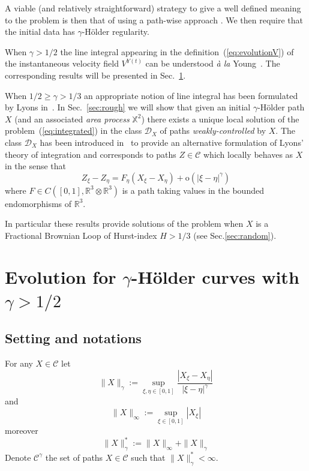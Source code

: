 \documentclass[a4paper,12pt,reqno]{amsart}
\newcommand{\norm}[1]{\|#1\|}
\newcommand{\RR}{\mathbb{R}^3}
\newcommand{\CC}{\mathscr{C}}
\newcommand{\DX}{\mathscr{D}_{X}}
\begin{document}
A viable (and relatively straightforward) strategy to give a well defined
meaning to the problem is then that of using a path-wise approach 
. We then require that the initial data has
$\gamma$-H\"older regularity. 

When $\gamma >
1/2$ the line integral appearing in the
definition~(\ref{eq:evolutionV}) of the instantaneous velocity field
$V^{Y(t)}$ can be understood \emph{\`a la} Young~\cite{young}. The
corresponding results will be presented in
Sec.~\ref{sec:young}. 

When $1/2 \ge  \gamma > 1/3$ an appropriate
notion of line integral has been formulated by Lyons
in~\cite{Lyons,LyonsBook}. In Sec.~\ref{sec:rough} we will show that
given an initial $\gamma$-H\"older path $X$ (and
an associated \emph{area process} $\mathbb{X}^2$) there exists a  unique local
solution of the problem~(\ref{eq:integrated}) in the class $\DX$ of paths
\emph{weakly-controlled} by $X$. The class $\DX$ has been introduced
in~\cite{Gubinelli} to provide an alternative formulation of Lyons' theory of
integration and corresponds to paths $Z \in \CC$ which locally behaves as
$X$ in the sense that
$$
Z_\xi - Z_\eta = F_\eta (X_\xi-X_\eta) + \text{o}(|\xi-\eta|^\gamma)
$$
where $F \in C([0,1],\RR \otimes \RR)$ is a path taking values in the
bounded endomorphisms of $\RR$.

In particular these results provide solutions of the problem when $X$
is a Fractional Brownian Loop of Hurst-index $H > 1/3$ (see Sec.\ref{sec:random}).


\section{Evolution for $\gamma$-H\"older curves with $\gamma > 1/2$}
\label{sec:young}

\subsection{Setting and notations}

For any $X \in \CC$ let
\begin{equation*}
  \|X\|_{\gamma} :=
\sup_{\xi,\eta\in[0,1]} \frac{|X_\xi-X_\eta|}{|\xi-\eta|^\gamma}
\end{equation*}
and
\begin{equation*}
  \|X\|_{\infty} :=
\sup_{\xi \in[0,1]} |X_\xi|
\end{equation*}
moreover
\begin{equation*}
  \|X\|_{\gamma}^{*} := \norm{X}_{\infty}+
  \norm{X}_{\gamma}
\end{equation*}
Denote $\CC^\gamma$ the set of paths $X \in \CC$ such that
$\norm{X}_{\gamma}^*< \infty$.
\end{document}
